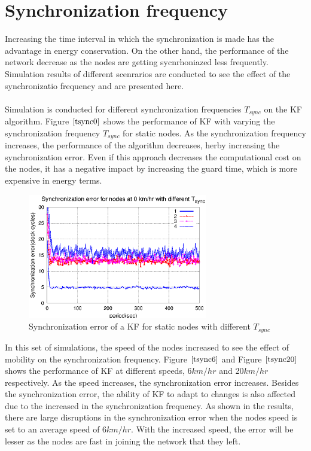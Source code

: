 \documentclass[a4paper,10pt]{report}
\begin{document}
\section{\textbf{Synchronization frequency}}
Increasing the time interval in which the synchronization is made has the advantage in energy conservation. On the other hand, the performance of the network decrease as the nodes are getting sycnrhoniazed less frequently. Simulation results of different scenrarios are conducted to see the effect of the synchronizatio frequency and are presented here.
\paragraph*{}
Simulation is conducted for different synchronization frequencies $T_{sync}$ on the KF algorithm. Figure $\ref{tsync0}$ shows the performance of KF with varying the synchronization frequency $T_{sync}$ for static nodes. As the synchronization frequency increases, the performance of the algorithm decreases, herby increasing the synchronization error. Even if this approach decreases the computational cost on the nodes, it has a negative impact by increasing the guard time, which is more expensive in energy terms.
\begin{figure}[!h]
\centering
\includegraphics[width= 0.7\textwidth]{tsync0}
\caption{Synchronization error of a KF for static nodes with different $T_{sync}$} \label{tsync0}
\end{figure}
In this set of simulations, the speed of the nodes increased to see the effect of mobility on the synchronization frequency. Figure $\ref{tsync6}$ and Figure $\ref{tsync20}$ shows the performance of KF at different speeds, 6$km/hr$ and 20$km/hr$ respectively. As the speed increases, the synchronization error increases. Besides the synchronization error, the ability of KF to adapt to changes is also affected due to the increased in the synchronization frequency. As shown in the results, there are large disruptions in the synchronization error when the nodes speed is set to an average speed of $6km/hr$. With the increased speed, the error will be lesser as the nodes are fast in joining the network that they left.  
\end{document}
